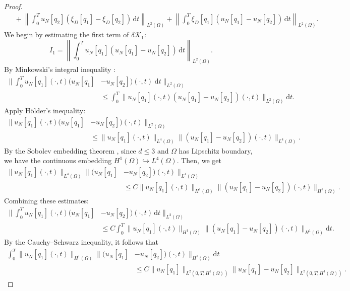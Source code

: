 \documentclass[a4paper,12pt,reqno,natbib]{amsart}
\newcommand{\dt} {\displaystyle\mathrm{d}t}
\begin{document}
{\begin{proof}
$$\begin{aligned}
&\;+ \left\| \int_0^T u_N[q_2] (\xi_D[q_1] - \xi_D[q_2]) \, \mathrm{d}t \right\|_{L^2(\Omega)} + \left\| \int_0^T \xi_D[q_1] (u_N[q_1] - u_N[q_2]) \, \mathrm{d}t \right\|_{L^2(\Omega)}.
\end{aligned}
$$
We begin by estimating the first term of \(\delta \mathcal{K}_1\):
\begin{equation*}
I_1 = \left\| \int_0^T u_N[q_1] (u_N[q_1] - u_N[q_2]) \, \mathrm{d}t \right\|_{L^2(\Omega)}.
\end{equation*}
By Minkowski's integral inequality \cite{folland1999real}:
\begin{align*}
    \Big\| \int_0^T u_N[q_1](\cdot,t) (u_N[q_1] &- u_N[q_2])(\cdot,t) \; \dt \Big\|_{L^2(\Omega)}\\
&\leq \int_0^T \Big\| u_N[q_1](\cdot,t) (u_N[q_1] - u_N[q_2])(\cdot,t) \Big\|_{L^2(\Omega)} \dt.
\end{align*}
Apply H\"older's inequality:
\begin{align*}
    \Big\| u_N[q_1](\cdot,t) (u_N[q_1] &- u_N[q_2])(\cdot,t) \Big\|_{L^2(\Omega)} \\&\leq \Big\|u_N[q_1](\cdot,t)\Big\|_{L^4(\Omega)}  \Big\|(u_N[q_1] - u_N[q_2])(\cdot,t)\Big\|_{L^4(\Omega)}.
\end{align*}
By the Sobolev embedding theorem \cite{brezis2010functional}, since $d \leq 3$ and $\Omega$ has Lipschitz boundary, we have the continuous embedding $H^1(\Omega) \hookrightarrow L^4(\Omega)$. Then, we get
\begin{align*}
    \Big\|u_N[q_1](\cdot,t)\Big\|_{L^4(\Omega)}  \Big\|(u_N[q_1] &- u_N[q_2])(\cdot,t)\Big\|_{L^4(\Omega)} \\ &\leq C \Big\|u_N[q_1](\cdot,t)\Big\|_{H^1(\Omega)}  \Big\|(u_N[q_1] - u_N[q_2])(\cdot,t)\Big\|_{H^1(\Omega)}.
\end{align*}
Combining these estimates:
\begin{align*}
    \Big\| \int_0^T u_N[q_1](\cdot,t) (u_N[q_1] &- u_N[q_2])(\cdot,t)  \,\dt \Big\|_{L^2(\Omega)}  \\
&\leq C \int_0^T \Big\|u_N[q_1](\cdot,t)\Big\|_{H^1(\Omega)}  \Big\|(u_N[q_1] - u_N[q_2])(\cdot,t)\Big\|_{H^1(\Omega)}  \dt.
\end{align*}
By the Cauchy–Schwarz inequality, it follows that
\begin{align*}
    \int_0^T \Big\|u_N[q_1](\cdot,t)\Big\|_{H^1(\Omega)}  \Big\|(u_N[q_1] &- u_N[q_2])(\cdot,t)\Big\|_{H^1(\Omega)}  \dt\\
&\leq C \Big\|u_N[q_1]\Big\|_{L^2(0,T; H^1(\Omega))}  \Big\|u_N[q_1] - u_N[q_2]\Big\|_{L^2(0,T; H^1(\Omega))}.

\end{align*}
\end{proof}}
\end{document}
